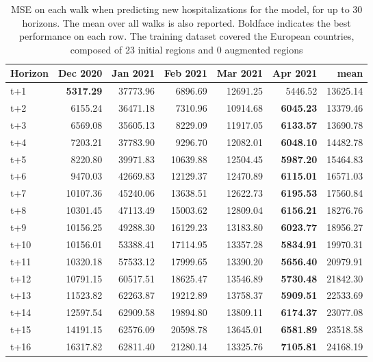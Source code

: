 \begin{table}[H]
\centering
\caption{MSE on each walk when predicting new hospitalizations for the model, for up to 30 horizons. The mean over all walks is also reported. Boldface indicates the best performance on each row. The training dataset covered the European countries, composed of 23 initial regions and 0 augmented regions }
\label{tab:MSE_walk_encoder_decoder}
\begin{tabular}{lrrrrrr}
\toprule
Horizon &  Dec 2020 &  Jan 2021 &  Feb 2021 &  Mar 2021 &  Apr 2021 &     mean \\
\midrule
t+1  & \textbf{5317.29}  & 37773.96  & 6896.69  & 12691.25  & 5446.52  & 13625.14  \\
t+2  & 6155.24  & 36471.18  & 7310.96  & 10914.68  & \textbf{6045.23}  & 13379.46  \\
t+3  & 6569.08  & 35605.13  & 8229.09  & 11917.05  & \textbf{6133.57}  & 13690.78  \\
t+4  & 7203.21  & 37783.90  & 9296.70  & 12082.01  & \textbf{6048.10}  & 14482.78  \\
t+5  & 8220.80  & 39971.83  & 10639.88  & 12504.45  & \textbf{5987.20}  & 15464.83  \\
t+6  & 9470.03  & 42669.83  & 12129.37  & 12470.89  & \textbf{6115.01}  & 16571.03  \\
t+7  & 10107.36  & 45240.06  & 13638.51  & 12622.73  & \textbf{6195.53}  & 17560.84  \\
t+8  & 10301.45  & 47113.49  & 15003.62  & 12809.04  & \textbf{6156.21}  & 18276.76  \\
t+9  & 10156.25  & 49288.30  & 16129.23  & 13183.80  & \textbf{6023.77}  & 18956.27  \\
t+10  & 10156.01  & 53388.41  & 17114.95  & 13357.28  & \textbf{5834.91}  & 19970.31  \\
t+11  & 10320.18  & 57533.12  & 17999.65  & 13390.20  & \textbf{5656.40}  & 20979.91  \\
t+12  & 10791.15  & 60517.51  & 18625.47  & 13546.89  & \textbf{5730.48}  & 21842.30  \\
t+13  & 11523.82  & 62263.87  & 19212.89  & 13758.37  & \textbf{5909.51}  & 22533.69  \\
t+14  & 12597.54  & 62909.58  & 19894.80  & 13809.11  & \textbf{6174.37}  & 23077.08  \\
t+15  & 14191.15  & 62576.09  & 20598.78  & 13645.01  & \textbf{6581.89}  & 23518.58  \\
t+16  & 16317.82  & 62811.40  & 21280.14  & 13325.76  & \textbf{7105.81}  & 24168.19  \\

\end{tabular}
\end{table}

